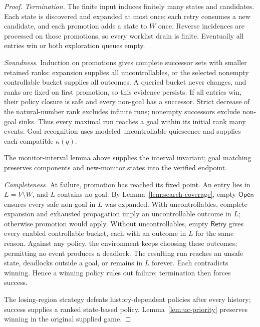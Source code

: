 \begin{proof}
\emph{Termination.} The finite input induces finitely many states and candidates. Each state is discovered and expanded at most once; each retry consumes a new candidate, and each promotion adds a state to $W$ once. Reverse incidences are processed on those promotions, so every worklist drain is finite. Eventually all entries win or both exploration queues empty.

\emph{Soundness.} Induction on promotions gives complete successor sets with smaller retained ranks: expansion supplies all uncontrollables, or the selected nonempty controllable bucket supplies all outcomes. A queried bucket never changes, and ranks are fixed on first promotion, so this evidence persists. If all entries win, their policy closure is safe and every non-goal has a successor. Strict decrease of the natural-number rank excludes infinite runs; nonempty successors exclude non-goal sinks. Thus every maximal run reaches a goal within its initial rank many events. Goal recognition uses modeled uncontrollable quiescence and supplies each compatible $\kappa(q)$.

The monitor-interval lemma above supplies the interval invariant; goal matching preserves components and new-monitor states into the verified endpoint.

\emph{Completeness.} At failure, promotion has reached its fixed point. An entry lies in $L=V\setminus W$, and $L$ contains no goal. By Lemma~\ref{lem:search-coverage}, empty $\mathsf{Open}$ ensures every safe non-goal in $L$ was expanded. With uncontrollables, complete expansion and exhausted propagation imply an uncontrollable outcome in $L$; otherwise promotion would apply. Without uncontrollables, empty $\mathsf{Retry}$ gives every enabled controllable bucket, each with an outcome in $L$ for the same reason. Against any policy, the environment keeps choosing these outcomes; permitting no event produces a deadlock. The resulting run reaches an unsafe state, deadlocks outside a goal, or remains in $L$ forever. Each contradicts winning. Hence a winning policy rules out failure; termination then forces success. 

The losing-region strategy defeats history-dependent policies after every history; success supplies a ranked state-based policy. Lemma~\ref{lem:uc-priority} preserves winning in the original supplied game.
\end{proof}

